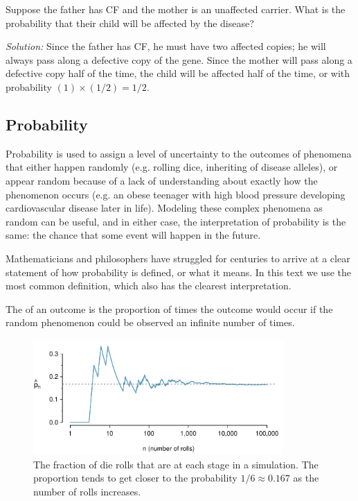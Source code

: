 \begin{exercise}
Suppose the father has CF and the mother is an unaffected carrier. What is the probability that their child will be affected by the disease?

\textit{Solution:}  Since the father has CF, he must have two affected copies; he will always pass along a defective copy of the gene.  Since the mother will pass along a defective copy half of the time, the child will be affected half of the time, or with probability $(1) \times (1/2) = 1/2$.
\end{exercise}

\newpage

\subsection{Probability}


Probability is used to assign a level of uncertainty to the outcomes of phenomena that either happen randomly (e.g. rolling dice, inheriting of disease alleles), or appear random because of a lack of understanding about exactly how the phenomenon occurs (e.g. an obese teenager with high blood pressure developing cardiovascular disease later in life). Modeling these complex phenomena as random can be useful, and in either case, the interpretation of probability is the same: the chance that some event will happen in the future.

Mathematicians and philosophers have struggled for centuries to arrive at a clear statement of how probability is defined, or what it means.  In this text we use the most common definition, which also has the clearest interpretation.

\begin{termBox}{
The  of an outcome is the proportion of times the outcome would occur if the random phenomenon could be observed an infinite number of times.}
\end{termBox}


\begin{figure}[bt]
	\centering
	\includegraphics[width=0.85\textwidth]{ch_probability_oi_biostat/figures/dieProp/dieProp}
	\caption{The fraction of die rolls that are  at each stage in a simulation. The proportion tends to get closer to the probability $1/6 \approx 0.167$ as the number of rolls increases.}
	\label{fig:dieProp}
\end{figure}

